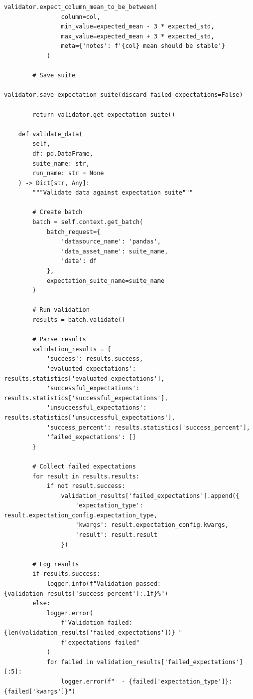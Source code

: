 \begin{lstlisting}[style=python, caption=Comprehensive Data Validation with Great Expectations]
            validator.expect_column_mean_to_be_between(
                column=col,
                min_value=expected_mean - 3 * expected_std,
                max_value=expected_mean + 3 * expected_std,
                meta={'notes': f'{col} mean should be stable'}
            )

        # Save suite
        validator.save_expectation_suite(discard_failed_expectations=False)

        return validator.get_expectation_suite()

    def validate_data(
        self,
        df: pd.DataFrame,
        suite_name: str,
        run_name: str = None
    ) -> Dict[str, Any]:
        """Validate data against expectation suite"""

        # Create batch
        batch = self.context.get_batch(
            batch_request={
                'datasource_name': 'pandas',
                'data_asset_name': suite_name,
                'data': df
            },
            expectation_suite_name=suite_name
        )

        # Run validation
        results = batch.validate()

        # Parse results
        validation_results = {
            'success': results.success,
            'evaluated_expectations': results.statistics['evaluated_expectations'],
            'successful_expectations': results.statistics['successful_expectations'],
            'unsuccessful_expectations': results.statistics['unsuccessful_expectations'],
            'success_percent': results.statistics['success_percent'],
            'failed_expectations': []
        }

        # Collect failed expectations
        for result in results.results:
            if not result.success:
                validation_results['failed_expectations'].append({
                    'expectation_type': result.expectation_config.expectation_type,
                    'kwargs': result.expectation_config.kwargs,
                    'result': result.result
                })

        # Log results
        if results.success:
            logger.info(f"Validation passed: {validation_results['success_percent']:.1f}%")
        else:
            logger.error(
                f"Validation failed: {len(validation_results['failed_expectations'])} "
                f"expectations failed"
            )
            for failed in validation_results['failed_expectations'][:5]:
                logger.error(f"  - {failed['expectation_type']}: {failed['kwargs']}")


\end{lstlisting}
